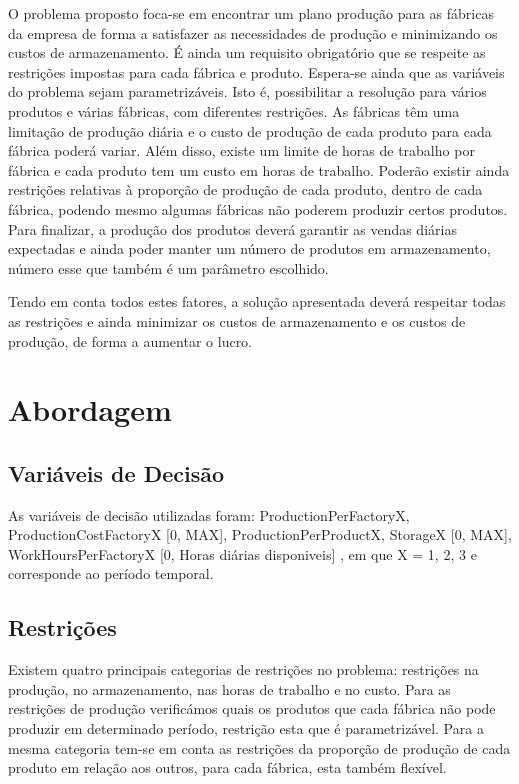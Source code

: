 \documentclass[runningheads,a4paper]{llncs}
\begin{document}
O problema proposto foca-se em encontrar um plano produção para as fábricas da empresa de forma a satisfazer as necessidades de produção e minimizando os custos de armazenamento. É ainda um requisito obrigatório que se respeite as restrições impostas para cada fábrica e produto. Espera-se ainda que as variáveis do problema sejam parametrizáveis. Isto é, possibilitar a resolução para vários produtos e várias fábricas, com diferentes restrições. 
As fábricas têm uma limitação de produção diária e o custo de produção de cada produto para cada fábrica poderá variar. Além disso, existe um limite de horas de trabalho por fábrica e cada produto tem um custo em horas de trabalho. Poderão existir ainda restrições relativas à proporção de produção de cada produto, dentro de cada fábrica, podendo mesmo algumas fábricas não poderem produzir certos produtos. Para finalizar, a produção dos produtos deverá garantir as vendas diárias expectadas e ainda poder manter um número de produtos em armazenamento, número esse que também é um parâmetro escolhido. 

Tendo em conta todos estes fatores, a solução apresentada deverá respeitar todas as restrições e ainda minimizar os custos de armazenamento e os custos de produção, de forma a aumentar o lucro. 

\section{Abordagem}

\subsection{Variáveis de Decisão}
As variáveis de decisão utilizadas foram: ProductionPerFactoryX, ProductionCostFactoryX [0, MAX], ProductionPerProductX, StorageX [0, MAX], WorkHoursPerFactoryX [0, Horas diárias disponiveis] , em que X = { 1, 2, 3 } e corresponde ao período temporal. 

\subsection{Restrições}
Existem quatro principais categorias de restrições no problema: restrições na produção, no armazenamento, nas horas de trabalho e no custo. Para as restrições de produção verificámos quais os produtos que cada fábrica não pode produzir em determinado período, restrição esta que é parametrizável. Para a mesma categoria tem-se em conta as restrições da proporção de produção de cada produto em relação aos outros, para cada fábrica, esta também flexível. 
\end{document}
